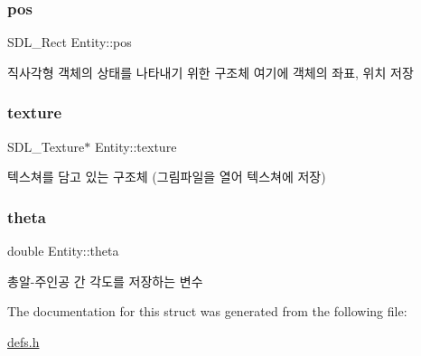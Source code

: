 \subsubsection{\texorpdfstring{pos}{pos}}
{\footnotesize\ttfamily S\+D\+L\+\_\+\+Rect Entity\+::pos}

직사각형 객체의 상태를 나타내기 위한 구조체 여기에 객체의 좌표, 위치 저장 \mbox{\label{struct_entity_a7e3a5bd3ee8f06d2641b183b4ea87933}} 
\subsubsection{\texorpdfstring{texture}{texture}}
{\footnotesize\ttfamily S\+D\+L\+\_\+\+Texture$\ast$ Entity\+::texture}

텍스쳐를 담고 있는 구조체 (그림파일을 열어 텍스쳐에 저장) \mbox{\label{struct_entity_a2e774bbee1f449ee3bfacd06880c1566}} 
\subsubsection{\texorpdfstring{theta}{theta}}
{\footnotesize\ttfamily double Entity\+::theta}

총알-\/주인공 간 각도를 저장하는 변수 

The documentation for this struct was generated from the following file\+:\begin{DoxyCompactItemize}
\item 
\hyperlink{defs_8h}{defs.\+h}\end{DoxyCompactItemize}
